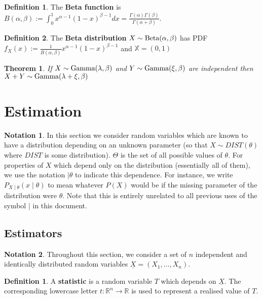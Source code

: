 \documentclass[12pt]{article}
\newtheorem{thm}{Theorem}[section]
\theoremstyle{definition}
\newtheorem{defn}{Definition}[subsection]
\newtheorem*{defn*}{Definition}
\newtheorem*{not*}{Notation}
\newcommand{\R}{\mathbb{R}}
\newcommand{\X}{\mathbb{X}}
\begin{document}
\begin{defn*}
  The \textbf{Beta function} is $B(\alpha, \beta) := \int_0^1x^{\alpha - 1}(1 - x)^{\beta - 1}dx = \frac{\Gamma(\alpha)\Gamma(\beta)}{\Gamma(\alpha + \beta)}$.
\end{defn*}

\begin{defn*}
  The \textbf{Beta distribution} $X \sim \textnormal{Beta}(\alpha, \beta)$ has PDF $f_X(x) := \frac{1}{B(\alpha, \beta)}x^{\alpha - 1}(1 - x)^{\beta - 1}$ and $\X = (0, 1)$
\end{defn*}


\begin{thm}
  If $X \sim \textnormal{Gamma}(\lambda, \beta)$ and $Y \sim \textnormal{Gamma}(\xi, \beta)$ are independent then $X + Y \sim \textnormal{Gamma}(\lambda + \xi, \beta)$
\end{thm}

\section{Estimation}

\begin{not*}
  In this section we consider random variables which are known to have a distribution depending on an unknown parameter (so that $X \sim DIST(\theta)$ where $DIST$ is some distribution).
  $\Theta$ is the set of all possible values of $\theta$.
  For properties of $X$ which depend only on the distribution (essentially all of them), we use the notation $\mid \theta$ to indicate this dependence.
  For instance, we write $P_{X \mid \theta}(x \mid \theta)$ to mean whatever $P(X)$ would be if the missing parameter of the distribution were $\theta$.
  Note that this is entirely unrelated to all previous uses of the symbol $\mid$ in this document.
\end{not*}

\subsection{Estimators}

\begin{not*}
  Throughout this section, we consider a set of $n$ independent and identically distributed random variables $\underline{X} = (X_1, \ldots, X_n)$.
\end{not*}

\begin{defn}
  A \textbf{statistic} is a random variable $T$ which depends on $\underline{X}$.
  The corresponding lowercase letter $t : \R^n \to \R$ is used to represent a realised value of $T$.
\end{defn}
\end{document}
